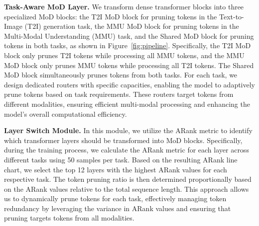


\textbf{Task-Aware MoD Layer.} We transform dense transformer blocks into three specialized MoD blocks: the T2I MoD block for pruning tokens in the Text-to-Image (T2I) generation task, the MMU MoD block for pruning tokens in the Multi-Modal Understanding (MMU) task, and the Shared MoD block for pruning tokens in both tasks, as shown in Figure~\ref{fig:pipeline}. Specifically, the T2I MoD block only prunes T2I tokens while processing all MMU tokens, and the MMU MoD block only prunes MMU tokens while processing all T2I tokens. The Shared MoD block simultaneously prunes tokens from both tasks. For each task, we design dedicated routers with specific capacities, enabling the model to adaptively prune tokens based on task requirements. These routers target tokens from different modalities, ensuring efficient multi-modal processing and enhancing the model's overall computational efficiency.




\textbf{Layer Switch Module.} In this module, we utilize the ARank metric to identify which transformer layers should be transformed into MoD blocks. Specifically, during the training process, we calculate the ARank metric for each layer across different tasks using 50 samples per task. Based on the resulting ARank line chart, we select the top 12 layers with the highest ARank values for each respective task. The token pruning ratio is then determined proportionally based on the ARank values relative to the total sequence length. This approach allows us to dynamically prune tokens for each task, effectively managing token redundancy by leveraging the variance in ARank values and ensuring that pruning targets tokens from all modalities.



